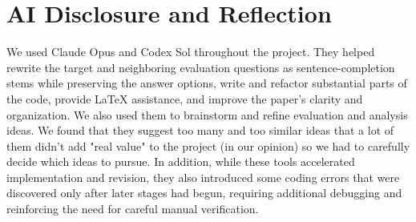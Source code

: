 \noindent\begin{minipage}[t]{\columnwidth}
\section*{AI Disclosure and Reflection}

We used Claude Opus and Codex Sol throughout the project. They helped rewrite
the target and neighboring evaluation questions as sentence-completion stems
while preserving the answer options, write and refactor substantial parts of
the code, provide LaTeX assistance, and improve the paper's clarity and
organization. We also used them to brainstorm and refine evaluation and
analysis ideas. We found that they suggest too many and too similar ideas that
a lot of them didn't add "real value" to the project (in our opinion) so we
had to carefully decide which ideas to pursue. In addition, while these tools
accelerated implementation and revision, they also introduced some coding
errors that were discovered only after later stages had begun, requiring
additional debugging and reinforcing the need for careful manual verification.
\end{minipage}
